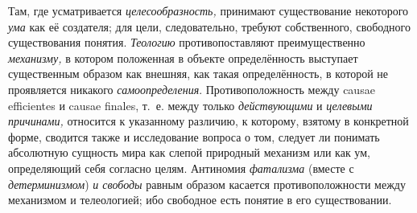 Там, где усматривается
{\em целесообразность,}
принимают существование некоторого
{\em ума} как её
создателя; для цели, следовательно, требуют собственного, свободного
существования понятия. {\em Теологию}
противопоставляют преимущественно
{\em механизму,} в
котором положенная в объекте определённость выступает существенным образом
как внешняя, как такая определённость, в которой не проявляется никакого
{\em самоопределения}.
Противоположность между causae efficientes и
causae finales, т.~е. между только
{\em действующими} и
{\em целевыми причинами,}
относится к указанному различию, к которому, взятому в
конкретной форме, сводится также и исследование вопроса о том, следует ли
понимать абсолютную сущность мира как слепой природный механизм или как ум,
определяющий себя согласно целям. Антиномия
{\em фатализма} (вместе с
{\em детерминизмом})
{\em и свободы} равным
образом касается противоположности между механизмом и телеологией; ибо
свободное есть понятие в его существовании.

